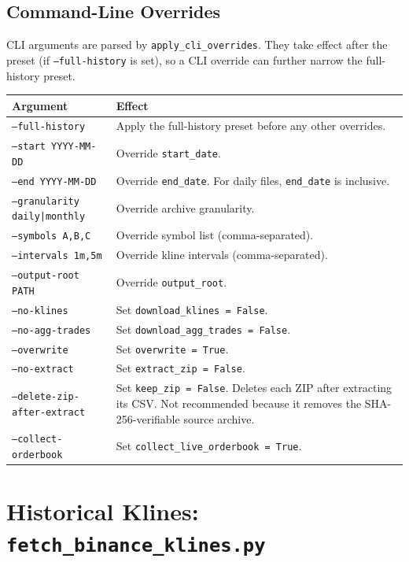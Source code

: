 \documentclass[11pt,a4paper]{article}
\begin{document}
\subsection{Command-Line Overrides}

CLI arguments are parsed by \texttt{apply\_cli\_overrides}. They take
effect after the preset (if \texttt{--full-history} is set), so a CLI
override can further narrow the full-history preset.

\begin{xltabular}{\linewidth}{L{5.0cm}Y}
\toprule
\textbf{Argument} & \textbf{Effect} \\
\midrule
\texttt{--full-history} &
  Apply the full-history preset before any other overrides. \\
\texttt{--start YYYY-MM-DD} & Override \texttt{start\_date}. \\
\texttt{--end YYYY-MM-DD} & Override \texttt{end\_date}. For daily
  files, \texttt{end\_date} is inclusive. \\
\texttt{--granularity daily|monthly} & Override archive granularity. \\
\texttt{--symbols A,B,C} & Override symbol list (comma-separated). \\
\texttt{--intervals 1m,5m} & Override kline intervals
  (comma-separated). \\
\texttt{--output-root PATH} & Override \texttt{output\_root}. \\
\texttt{--no-klines} & Set \texttt{download\_klines = False}. \\
\texttt{--no-agg-trades} & Set \texttt{download\_agg\_trades = False}. \\
\texttt{--overwrite} & Set \texttt{overwrite = True}. \\
\texttt{--no-extract} & Set \texttt{extract\_zip = False}. \\
\texttt{--delete-zip-after-extract} & Set \texttt{keep\_zip = False}.
  Deletes each ZIP after extracting its CSV. Not recommended because
  it removes the SHA-256-verifiable source archive. \\
\texttt{--collect-orderbook} & Set \texttt{collect\_live\_orderbook
  = True}. \\
\bottomrule
\end{xltabular}

\section{Historical Klines: \texttt{fetch\_binance\_klines.py}}
\label{sec:klines}
\end{document}

